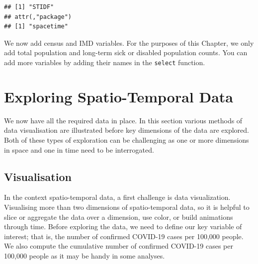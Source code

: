 \documentclass[
]{book}
\newenvironment{Shaded}{\begin{snugshade}}{\end{snugshade}}
\newcommand{\CommentTok}[1]{\textcolor[rgb]{0.56,0.35,0.01}{\textit{#1}}}
\newcommand{\DataTypeTok}[1]{\textcolor[rgb]{0.13,0.29,0.53}{#1}}
\newcommand{\KeywordTok}[1]{\textcolor[rgb]{0.13,0.29,0.53}{\textbf{#1}}}
\newcommand{\NormalTok}[1]{#1}
\newcommand{\OperatorTok}[1]{\textcolor[rgb]{0.81,0.36,0.00}{\textbf{#1}}}
\newcommand{\StringTok}[1]{\textcolor[rgb]{0.31,0.60,0.02}{#1}}
\begin{document}
\begin{verbatim}
## [1] "STIDF"
## attr(,"package")
## [1] "spacetime"
\end{verbatim}

We now add census and IMD variables. For the purposes of this Chapter, we only add total population and long-term sick or disabled population counts. You can add more variables by adding their names in the \texttt{select} function.

\begin{Shaded}
\end{Shaded}

\hypertarget{exploring-spatio-temporal-data}{%
\section{Exploring Spatio-Temporal Data}\label{exploring-spatio-temporal-data}}

We now have all the required data in place. In this section various methods of data visualisation are illustrated before key dimensions of the data are explored. Both of these types of exploration can be challenging as one or more dimensions in space and one in time need to be interrogated.

\hypertarget{visualisation}{%
\subsection{Visualisation}\label{visualisation}}

In the context spatio-temporal data, a first challenge is data visualization. Visualising more than two dimensions of spatio-temporal data, so it is helpful to slice or aggregate the data over a dimension, use color, or build animations through time. Before exploring the data, we need to define our key variable of interest; that is, the number of confirmed COVID-19 cases per 100,000 people. We also compute the cumulative number of confirmed COVID-19 cases per 100,000 people as it may be handy in some analyses.
\end{document}
